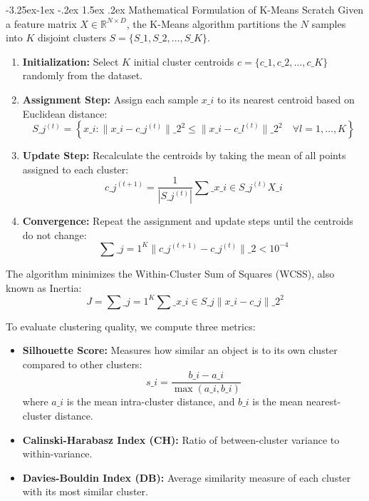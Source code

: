 \documentclass[12pt,a4paper]{article}
\makeatletter
\renewcommand\paragraph{\@startsection{paragraph}{4}{\z@}%
  {-3.25ex\@plus -1ex \@minus -.2ex}%
  {1.5ex \@plus .2ex}%
  {\normalfont\normalsize\bfseries}}
\makeatother
\begin{document}
\paragraph{Mathematical Formulation of K-Means Scratch}
Given a feature matrix $X \in \mathbb{R}^{N \times D}$, the K-Means algorithm partitions the $N$ samples into $K$ disjoint clusters $S = \{S\_1, S\_2, \dots, S\_K\}$.
\begin{enumerate}
    \item \textbf{Initialization:} Select $K$ initial cluster centroids $c = \{c\_1, c\_2, \dots, c\_K\}$ randomly from the dataset.
    \item \textbf{Assignment Step:} Assign each sample $x\_i$ to its nearest centroid based on Euclidean distance:
        \[
        S\_j^{(t)} = \left\{ x\_i : \|x\_i - c\_j^{(t)}\|\_2^2 \le \|x\_i - c\_l^{(t)}\|\_2^2 \quad \forall l = 1, \dots, K \right\}
        \]
    \item \textbf{Update Step:} Recalculate the centroids by taking the mean of all points assigned to each cluster:
        \[
        c\_j^{(t+1)} = \frac{1}{|S\_j^{(t)}|} \sum\_{x\_i \in S\_j^{(t)}} X\_i
        \]
    \item \textbf{Convergence:} Repeat the assignment and update steps until the centroids do not change:
        \[
        \sum\_{j=1}^K \|c\_j^{(t+1)} - c\_j^{(t)}\|\_2 < 10^{-4}
        \]
\end{enumerate}
The algorithm minimizes the Within-Cluster Sum of Squares (WCSS), also known as Inertia:
\[
J = \sum\_{j=1}^K \sum\_{x\_i \in S\_j} \|x\_i - c\_j\|\_2^2
\]

To evaluate clustering quality, we compute three metrics:
\begin{itemize}
    \item \textbf{Silhouette Score:} Measures how similar an object is to its own cluster compared to other clusters:
        \[
        s\_i = \frac{b\_i - a\_i}{\max(a\_i, b\_i)}
        \]
        where $a\_i$ is the mean intra-cluster distance, and $b\_i$ is the mean nearest-cluster distance.
    \item \textbf{Calinski-Harabasz Index (CH):} Ratio of between-cluster variance to within-variance.
    \item \textbf{Davies-Bouldin Index (DB):} Average similarity measure of each cluster with its most similar cluster.
\end{itemize}
\end{document}

